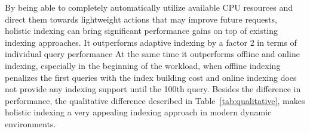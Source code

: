 By being able to completely automatically utilize available CPU resources and direct them 
towards lightweight actions that may improve future requests,
holistic indexing can bring significant performance gains on top of existing indexing approaches. 
It outperforms adaptive indexing by a factor 2 in terms of individual query performance
At the same time it outperforms offline and online indexing, especially in the beginning of the workload, 
when offline indexing penalizes the first queries with the index building cost and online indexing does not provide any indexing support
until the 100th query.
Besides the difference in performance, the qualitative difference described in Table~\ref{tab:qualitative}, makes holistic indexing a very appealing indexing approach in modern dynamic environments.



